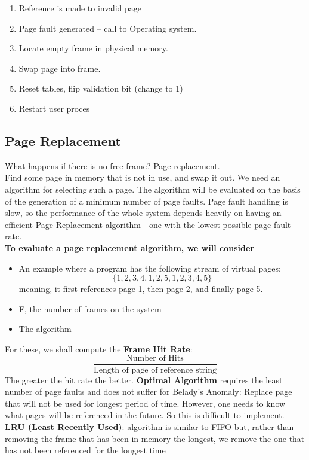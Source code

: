 \documentclass[a4paper, 10pt]{article}
\begin{document}
\begin{enumerate}
    \item Reference is made to invalid page
    \item Page fault generated – call to Operating system.
    \item Locate empty frame in physical memory.
    \item Swap page into frame.
    \item Reset tables, flip validation bit (change to 1)
    \item Restart user proces
\end{enumerate}
\subsection{Page Replacement}
What happens if there is no free frame? Page replacement. \\[2ex]
Find some page in memory that is not in use, and swap it out. We need an algorithm for selecting such a page. The algorithm will be evaluated on the basis of the generation of a minimum number of page faults. Page fault handling is slow, so the performance of the whole system depends heavily on having an efficient Page Replacement algorithm - one with the lowest possible page fault rate. \\[2ex]
\textbf{To evaluate a page replacement algorithm, we will consider}
\begin{itemize}
    \item An example where a program has the following stream of virtual pages:
          $$ \{1,2,3,4,1,2,5,1,2,3,4,5\}$$
          meaning, it first references page 1, then page 2, and finally page 5.
    \item F, the number of frames on the system
    \item The algorithm
\end{itemize}
For these, we shall compute the \textbf{Frame Hit Rate}:
$$\frac{\text{Number of Hits}}{\text{Length of page of reference string}}$$
The greater the hit rate the better.
\textbf{Optimal Algorithm} requires the least number of page faults and does not suffer for Belady's Anomaly: Replace page that will not be used for longest period of time. However, one needs to know what pages will be referenced in the future. So this is difficult to implement. \\[2ex]
\textbf{LRU (Least Recently Used)}: algorithm is similar to FIFO but, rather than removing the frame that has been in memory the longest, we remove the one that has not been referenced for the longest time
\end{document}
